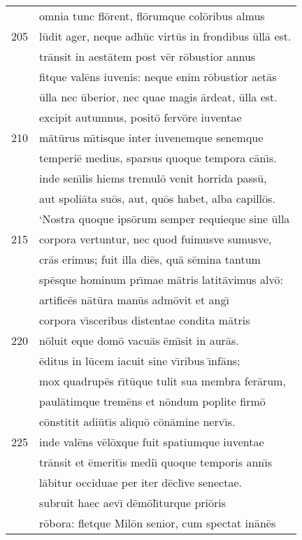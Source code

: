 \documentclass[paper=6in:9in,pagesize=pdftex,
               headinclude=on,footinclude=on,12pt]{scrbook}
\begin{document}
\begin{longtable}[p]{ r l }
 & omnia tunc fl\=orent, fl\=orumque col\=oribus almus\\ 
205 & l\=udit ager, neque adh\=uc virt\=us in frondibus \=ull\=a est.\\ 
 & tr\=ansit in aest\=atem post v\=er r\=obustior annus\\ 
 & fitque val\=ens iuvenis: neque enim r\=obustior aet\=as\\ 
 & \=ulla nec \=uberior, nec quae magis \=ardeat, \=ulla est.\\ 
 & excipit autumnus, posit\=o ferv\=ore iuventae\\ 
210 & m\=at\=urus m\={\i}tisque inter iuvenemque senemque\\ 
 & temperi\=e medius, sparsus quoque tempora c\=an\={\i}s.\\ 
 & inde sen\={\i}lis hiems tremul\=o venit horrida pass\=u,\\ 
 & aut spoli\=ata su\=os, aut, qu\=os habet, alba capill\=os.\\ 
 & \indent `Nostra quoque ips\=orum semper requieque sine \=ulla\\ 
215 & corpora vertuntur, nec quod fuimusve sumusve,\\ 
 & cr\=as erimus; fuit illa di\=es, qu\=a s\=emina tantum\\ 
 & sp\=esque hominum pr\={\i}mae m\=atris latit\=avimus alv\=o:\\ 
 & artific\=es n\=at\=ura man\=us adm\=ovit et ang\={\i}\\ 
 & corpora v\={\i}sceribus distentae condita m\=atris\\ 
220 & n\=oluit eque dom\=o vacu\=as \=em\={\i}sit in aur\=as.\\ 
 & \=editus in l\=ucem iacuit sine v\={\i}ribus \={\i}nf\=ans;\\ 
 & mox quadrup\=es r\={\i}t\=uque tulit sua membra fer\=arum,\\ 
 & paul\=atimque trem\=ens et n\=ondum poplite firm\=o\\ 
 & c\=onstitit adi\=ut\={\i}s aliqu\=o c\=on\=amine nerv\={\i}s.\\ 
225 & inde val\=ens v\=el\=oxque fuit spatiumque iuventae\\ 
 & tr\=ansit et \=emerit\={\i}s medi\={\i} quoque temporis ann\={\i}s\\ 
 & l\=abitur occiduae per iter d\=ecl\={\i}ve senectae.\\ 
 & subruit haec aev\={\i} d\=em\=ol\={\i}turque pri\=oris\\ 
 & r\=obora: fletque Mil\=on senior, cum spectat in\=an\=es\\ 

\end{longtable}
\end{document}
